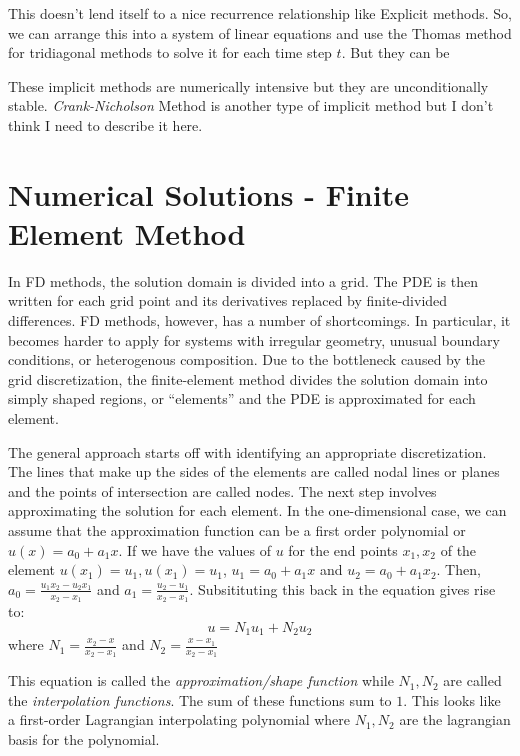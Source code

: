 \documentclass[12pt]{article}
\begin{document}
This doesn't lend itself to a nice recurrence relationship like Explicit methods. So, we can arrange this into a system of linear equations and use the Thomas method for tridiagonal methods to solve it for each time step $t$. But they can be 

These implicit methods are numerically intensive but they are unconditionally stable. \textit{Crank-Nicholson} Method is another type of implicit method but I don't think I need to describe it here. 



\section{Numerical Solutions - Finite Element Method}


In FD methods, the solution domain is divided into a grid. The PDE is then written for each grid point and its derivatives replaced by finite-divided differences. FD methods, however, has a number of shortcomings. In particular, it becomes harder to apply for
systems with irregular geometry, unusual boundary conditions, or heterogenous composition. Due to the bottleneck caused by the grid discretization, the finite-element method divides the solution domain into simply shaped regions, or ``elements'' and the PDE is approximated for each element.

The general approach starts off with identifying an appropriate discretization. The lines that make up the sides of the elements are called nodal lines or planes and the points of intersection are called nodes. The next step involves approximating the solution for each element. In the one-dimensional case, we can assume that the approximation function can be a first order polynomial or $u(x) = a_0 + a_1 x$. If we have the values of $u$ for the end points  $x_1, x_2$ of the element $u(x_1) = u_1, u(x_1) = u_1$, $u_1 = a_0 + a_1 x$ and $u_2 = a_0 + a_1 x_2$. Then, $a_0 = \frac{u_1x_2 - u_2x_1}{x_2 - x_1}$ and $a_1 = \frac{u_2- u_1}{x_2 - x_1}$. Subsitituting this back in the equation gives rise to: $$u = N_1 u_1 + N_2 u_2$$ where $N_1 = \frac{x_2 - x}{x_2 - x_1}$ and $N_2 = \frac{x - x_1}{x_2 - x_1}$

This equation is called the \textit{approximation/shape function} while $N_1, N_2$ are called the \textit{interpolation functions}. The sum of these functions sum to $1$. This looks like a first-order Lagrangian interpolating polynomial where $N_1, N_2$ are the lagrangian basis for the polynomial. 
\end{document}
